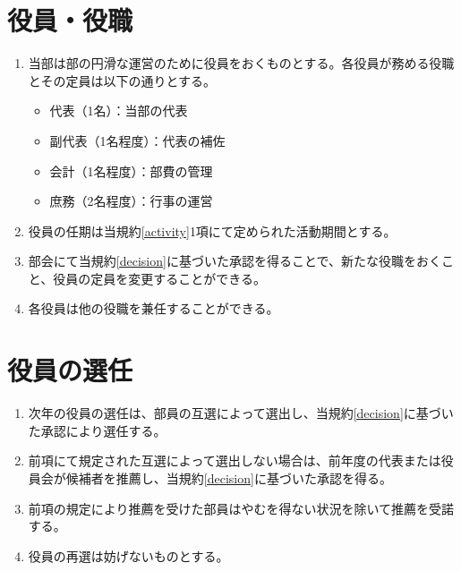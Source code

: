 \documentclass[12pt, unicode, a4paper]{ltjsreport}
\begin{document}
    \section{役員・役職}\label{directors}
        \begin{enumerate}
            \item 当部は部の円滑な運営のために役員をおくものとする。各役員が務める役職とその定員は以下の通りとする。
            \begin{itemize}
                \item 代表（1名）：当部の代表
                \item 副代表（1名程度）：代表の補佐
                \item 会計（1名程度）：部費の管理
                \item 庶務（2名程度）：行事の運営
            \end{itemize}
            \item 役員の任期は当規約\ref{activity}1項にて定められた活動期間とする。
            \item 部会にて当規約\ref{decision}に基づいた承認を得ることで、新たな役職をおくこと、役員の定員を変更することができる。
            \item 各役員は他の役職を兼任することができる。
        \end{enumerate}

    \section{役員の選任}\label{election}
        \begin{enumerate}
            \item 次年の役員の選任は、部員の互選によって選出し、当規約\ref{decision}に基づいた承認により選任する。
            \item 前項にて規定された互選によって選出しない場合は、前年度の代表または役員会が候補者を推薦し、当規約\ref{decision}に基づいた承認を得る。
            \item 前項の規定により推薦を受けた部員はやむを得ない状況を除いて推薦を受諾する。
            \item 役員の再選は妨げないものとする。
        \end{enumerate}
\end{document}
